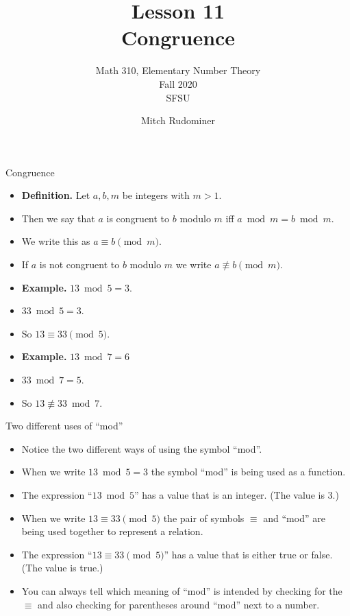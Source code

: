 \documentclass{beamer}
\title{Lesson 11 \\ Congruence}
\subtitle{Math 310, Elementary Number Theory \\ Fall 2020 \\ SFSU}
\author{Mitch Rudominer}
\date{}
\begin{document}
\begin{frame}
  \titlepage
\end{frame}

\begin{frame}{Congruence}

\begin{itemize}
  \item \textbf{Definition.} Let $a,b,m$ be integers with $m>1$.
  \item Then we say that $a$ is congruent to $b$ modulo $m$ iff $a\bmod m = b\bmod m$.
  \item We write this as $a\equiv b \pmod m$.
  \item If $a$ is not congruent to $b$ modulo $m$ we write $a\not\equiv b \pmod m$.
  \item \textbf{Example.} $13\bmod 5 = 3$.
  \item $33 \bmod 5 = 3$.
  \item So $13 \equiv 33 \pmod 5$.
  \item \textbf{Example.} $13 \bmod 7 = 6$
  \item $33 \bmod 7 = 5$.
  \item So $13 \not\equiv 33 \bmod 7$.
\end{itemize}

\end{frame}

\begin{frame}{Two different uses of ``mod''}

\begin{itemize}
  \item Notice the two different ways of using the symbol ``mod''.
  \item When we write $13\bmod 5 = 3$ the symbol ``mod'' is being used as a function.
  \item The expression ``$13\bmod 5$'' has a value that is an integer. (The value is 3.)
  \item When we write $13 \equiv 33 \pmod 5$ the pair of symbols $\equiv$ and ``mod'' are being
  used together to represent a relation.
  \item The expression ``$13 \equiv 33 \pmod 5$'' has a value that is either true or false. (The value is true.)
  \item You can always tell which meaning of ``mod'' is intended by checking for the $\equiv$ and
  also checking for parentheses around  ``mod'' next to a number.
\end{itemize}

\end{frame}
\end{document}

